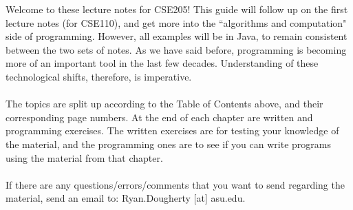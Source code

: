 %
\newpage
\tableofcontents
\newpage
%
%
Welcome to these lecture notes for CSE205! This guide will follow up on the first lecture notes (for CSE110), and get more into the ``algorithms and computation" side of programming. However, all examples will be in Java, to remain consistent between the two sets of notes. As we have said before, programming is becoming more of an important tool in the last few decades. Understanding of these technological shifts, therefore, is imperative. 
\\ \\
The topics are split up according to the Table of Contents above, and their corresponding page numbers. At the end of each chapter are written and programming exercises. The written exercises are for testing your knowledge of the material, and the programming ones are to see if you can write programs using the material from that chapter. 
\\ \\
If there are any questions/errors/comments that you want to send regarding the material, send an email to: Ryan.Dougherty [at] asu.edu.